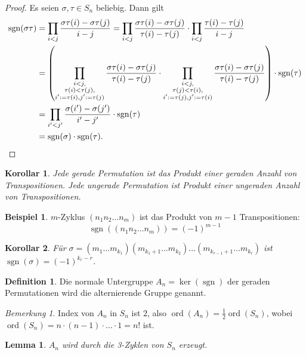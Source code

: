 \documentclass[12pt]{scrartcl} %
\DeclareMathOperator{\ord}{ord}
\DeclareMathOperator{\sgn}{sgn}
\newtheorem{lemma}{Lemma}
\newtheorem{kor}{Korollar}
\theoremstyle{definition}
\newtheorem*{defn}{Definition}
\newtheorem{ex}{Beispiel}
\theoremstyle{remark}
\newtheorem*{nb}{Bemerkung}
\begin{document}
\begin{proof}
	Es seien $\sigma,\tau\in S_n$ beliebig. Dann gilt 
	\begin{align*}
		\sgn(\sigma\tau) &= \prod_{i<j}\frac{\sigma\tau(i)-\sigma\tau(j)}{i-j} = \prod_{i<j}\frac{\sigma\tau(i)-\sigma\tau(j)}{\tau(i)-\tau(j)}\cdot\prod_{i<j}\frac{\tau(i)-\tau(j)}{i-j} \\
		&= \left(\prod_{\substack{i<j,\\\tau(i)<\tau(j),\\ i':=\tau(i),j':=\tau(j)}}\frac{\sigma\tau(i)-\sigma\tau(j)}{\tau(i)-\tau(j)}\cdot \prod_{\substack{i<j,\\\tau(j)<\tau(i),\\ i':=\tau(j),j':=\tau(i)}}\frac{\sigma\tau(i)-\sigma\tau(j)}{\tau(i)-\tau(j)}\right)\cdot \sgn(\tau) \\
		&=\prod_{i'<j'}\frac{\sigma(i')-\sigma(j')}{i'-j'}\cdot \sgn(\tau) \\
		&= \sgn(\sigma)\cdot \sgn(\tau).\qedhere
	\end{align*}
\end{proof}

\begin{kor}
	Jede gerade Permutation ist das Produkt einer geraden Anzahl von Transpositionen. Jede ungerade Permutation ist Produkt einer ungeraden Anzahl von Transpositionen.
\end{kor}

\begin{ex}
	\(m\)-Zyklus $(n_1n_2 \dots n_m)$ ist das Produkt von $m-1$ Transpositionen:
	\[\sgn((n_1n_2 \dots n_m))=(-1)^{m-1}\]
\end{ex}

\begin{kor}
	Für $\sigma = (m_1 \dots m_{k_1})(m_{k_1+1} \dots m_{k_2}) \dots (m_{k_{r-1}+1} \dots m_{k_r})$ ist $\sgn(\sigma)=(-1)^{k_r-r}$.
\end{kor}

\begin{defn}
	Die normale Untergruppe $A_n=\ker(\sgn)$ der geraden Permutationen wird die alternierende Gruppe genannt.
\end{defn}
	
\begin{nb}
	Index von $A_n$ in $S_n$ ist \(2\), also \(\ord(A_n)=\frac{1}{2}\ord(S_n)\), wobei $\ord(S_n)=n\cdot(n-1)\cdot\ldots\cdot1=n!$ ist.
\end{nb}
	
\begin{lemma}
	$A_n$ wird durch die 3-Zyklen von $S_n$ erzeugt.
\end{lemma}
	
\end{document}
